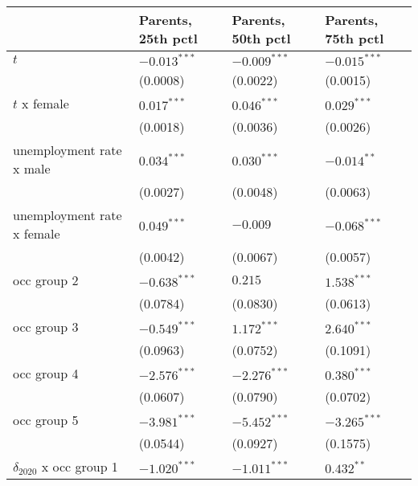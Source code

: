 \begin{tabular}{llll}
\toprule
{} & Parents, 25th pctl & Parents, 50th pctl & Parents, 75th pctl \\
\midrule
$t$                                    &     $-0.013^{***}$ &     $-0.009^{***}$ &     $-0.015^{***}$ \\
                                       &           (0.0008) &           (0.0022) &           (0.0015) \\
$t$ x female                           &      $0.017^{***}$ &      $0.046^{***}$ &      $0.029^{***}$ \\
                                       &           (0.0018) &           (0.0036) &           (0.0026) \\
unemployment rate x male               &      $0.034^{***}$ &      $0.030^{***}$ &      $-0.014^{**}$ \\
                                       &           (0.0027) &           (0.0048) &           (0.0063) \\
unemployment rate x female             &      $0.049^{***}$ &           $-0.009$ &     $-0.068^{***}$ \\
                                       &           (0.0042) &           (0.0067) &           (0.0057) \\
occ group 2                            &     $-0.638^{***}$ &            $0.215$ &      $1.538^{***}$ \\
                                       &           (0.0784) &           (0.0830) &           (0.0613) \\
occ group 3                            &     $-0.549^{***}$ &      $1.172^{***}$ &      $2.640^{***}$ \\
                                       &           (0.0963) &           (0.0752) &           (0.1091) \\
occ group 4                            &     $-2.576^{***}$ &     $-2.276^{***}$ &      $0.380^{***}$ \\
                                       &           (0.0607) &           (0.0790) &           (0.0702) \\
occ group 5                            &     $-3.981^{***}$ &     $-5.452^{***}$ &     $-3.265^{***}$ \\
                                       &           (0.0544) &           (0.0927) &           (0.1575) \\
$\delta_{2020}$ x occ group 1          &     $-1.020^{***}$ &     $-1.011^{***}$ &       $0.432^{**}$ \\

\end{tabular}

